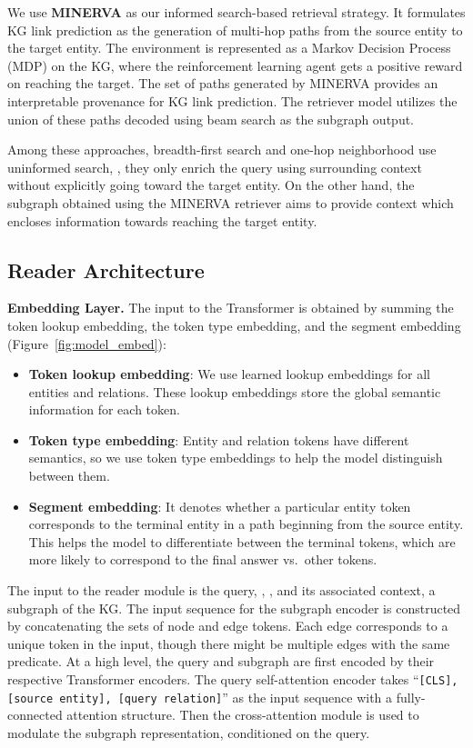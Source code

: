 We use \textbf{MINERVA} \citep{das2018go} as our informed search-based retrieval strategy.
It formulates KG link prediction as the generation of multi-hop paths from the source entity to the target entity. The environment is represented as a Markov Decision Process (MDP) on the KG, where the reinforcement learning agent gets a positive reward on reaching the target. The set of paths generated by MINERVA provides an interpretable provenance for KG link prediction. The retriever model utilizes the union of these paths decoded using beam search as the subgraph output.



Among these approaches, breadth-first search and one-hop neighborhood use uninformed search, \ie, they only enrich the query using surrounding context without explicitly going toward the target entity. On the other hand, the subgraph obtained using the MINERVA retriever aims to provide context which encloses information towards reaching the target entity.

\subsection{Reader Architecture}

\noindent \textbf{Embedding Layer.}
The input to the Transformer is obtained by summing the token lookup embedding, the token type embedding, and the segment embedding (Figure~\ref{fig:model_embed}):
\begin{itemize}
\item \textbf{Token lookup embedding}: We use learned lookup embeddings for all entities and relations. These lookup embeddings store the global semantic information for each token.
    \item \textbf{Token type embedding}: Entity and relation tokens have different semantics, so we use token type embeddings to help the model distinguish between them.
    \item \textbf{Segment embedding}: It denotes whether a particular entity token corresponds to the terminal entity in a path beginning from the source entity. This helps the model to differentiate between the terminal tokens, which are more likely to correspond to the final answer vs.\ other tokens.
\end{itemize}
The input to the reader module is the query, \eg, , and its associated context, a subgraph of the KG\@. The input sequence for the subgraph encoder is constructed by concatenating the sets of node and edge tokens.
Each edge corresponds to a unique token in the input, though there might be multiple edges with the same predicate.
At a high level, the query and subgraph are first encoded by their respective Transformer encoders.  The query self-attention encoder takes ``\texttt{[CLS], [source entity], [query relation]}'' as the input sequence with a fully-connected attention structure. Then the cross-attention module is used to modulate the subgraph representation, conditioned on the query.\\

